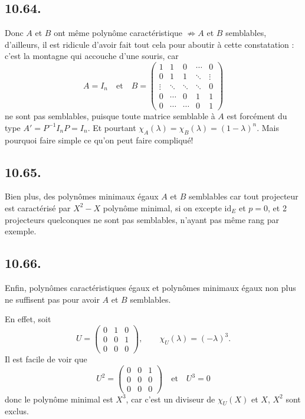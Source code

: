 \subsection*{10.64.}
Donc $A$ et $B$ ont même polynôme caractéristique $\not\Rightarrow A$ et $B$ semblables, d'ailleurs, il est ridicule d'avoir fait tout cela pour aboutir à cette constatation : c'est la montagne qui accouche d'une souris, car
\[
A=I_n
\quad\text{et}\quad
B=\begin{pmatrix}
1&1&0&\cdots&0\\
0&1&1&\ddots&\vdots\\
\vdots&\ddots&\ddots&\ddots&0\\
0&\cdots&0&1&1\\
0&\cdots&\cdots&0&1
\end{pmatrix}
\]
ne sont pas semblables, puisque toute matrice semblable à $A$ est forcément du type $A'=P^{-1}I_nP=I_n$. Et pourtant $\chi_A(\lambda)=\chi_B(\lambda)=(1-\lambda)^n$. Mais pourquoi faire simple ce qu'on peut faire compliqué!

\subsection*{10.65.}
Bien plus, des polynômes minimaux égaux  $A$ et $B$ semblables car tout projecteur est caractérisé par $X^2-X$ polynôme minimal, si on excepte $\mathrm{id}_E$ et $p=0$, et 2 projecteurs quelconques ne sont pas semblables, n'ayant pas même rang par exemple.

\subsection*{10.66.}
Enfin, polynômes caractéristiques égaux et polynômes minimaux égaux non plus ne suffisent pas pour avoir $A$ et $B$ semblables.

En effet, soit
\[
U=\begin{pmatrix}0&1&0\\0&0&1\\0&0&0\end{pmatrix},
\qquad \chi_U(\lambda)=(-\lambda)^3.
\]
Il est facile de voir que
\[
U^2=\begin{pmatrix}0&0&1\\0&0&0\\0&0&0\end{pmatrix}
\quad\text{et}\quad U^3=0
\]
donc le polynôme minimal est $X^3$, car c'est un diviseur de $\chi_U(X)$ et $X$, $X^2$ sont exclus.

